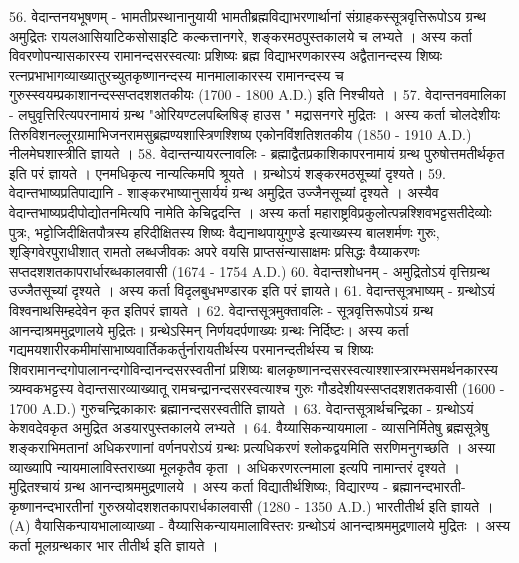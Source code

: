 56. वेदान्तनयभूषणम् -
भामतीप्रस्थानानुयायी भामतीब्रह्मविद्याभरणार्थानां संग्राहकस्सूत्रवृत्तिरूपोऽय ग्रन्थ अमुद्रितः रायलआसियाटिकसोसाइटि कल्कत्तानगरे, शङ्करमठपुस्तकालये च लभ्यते । अस्य कर्ता विवरणोपन्यासकारस्य रामानन्दसरस्वत्याः प्रशिष्यः ब्रह्म विद्याभरणकारस्य अद्वैतानन्दस्य शिष्यः रत्नप्रभाभागव्याख्यातुरच्युतकृष्णानन्दस्य मानमालाकारस्य रामानन्दस्य च गुरुस्स्वयम्प्रकाशानन्दस्सप्तदशशतकीयः (1700 - 1800 A.D.) इति निश्चीयते । 
57. वेदान्तनवमालिका -
लघुवृत्तिरित्यपरनामायं ग्रन्थ  "ओरियण्टलपब्लिषिङ् हाउस " मद्रासनगरे मुद्रितः । अस्य कर्ता चोलदेशीयः तिरुविशनल्लूरग्रामाभिजनरामसुब्रह्मण्यशास्त्रिणश्शिष्य एकोनविंशतिशतकीय (1850 - 1910 A.D.) नीलमेघशास्त्रीति ज्ञायते ।
58. वेदान्तन्यायरत्नावलिः -
ब्रह्माद्वैतप्रकाशिकापरनामायं ग्रन्थ पुरुषोत्तमतीर्थकृत इति परं ज्ञायते । एनमधिकृत्य नान्यत्किमपि श्रूयते । ग्रन्थोऽयं शङ्करमठसूच्यां दृश्यते। 
59. वेदान्तभाष्यप्रतिपाद्यानि - 
शाङ्करभाष्यानुसार्ययं ग्रन्थ अमुद्रित उज्जैनसूच्यां दृश्यते । अस्यैव वेदान्तभाष्यप्रदीपोद्योतनमित्यपि नामेति केचिद्वदन्ति । अस्य कर्ता महाराष्ट्रविप्रकुलोत्पन्नश्शिवभट्टसतीदेव्योः पुत्रः, भट्टोजिदीक्षितपौत्रस्य हरिदीक्षितस्य शिष्यः वैद्यनाथपायुगुण्डे इत्याख्यस्य बालशर्मणः गुरुः, शृङ्गिवेरपुराधीशात् रामतो लब्धजीवकः अपरे वयसि प्राप्तसंन्यासाक्षमः प्रसिद्धः वैय्याकरणः सप्तदशशतकापरार्धारब्धकालवासी (1674 - 1754 A.D.) 
60. वेदान्तशोधनम् - अमुद्रितोऽयं वृत्तिग्रन्थ उज्जैतसूच्यां दृश्यते । अस्य कर्ता विदृलबुधभण्डारक इति परं ज्ञायते।
61. वेदान्तसूत्रभाष्यम् - ग्रन्थोऽयं विश्वनाथसिम्हदेवेन कृत इतिपरं ज्ञायते ।
62. वेदान्तसूत्रमुक्तावलिः - सूत्रवृत्तिरूपोऽयं ग्रन्थ आनन्दाश्रममुद्रणालये मुद्रितः। ग्रन्थेऽस्मिन् निर्णयदर्पणाख्यः ग्रन्थः निर्दिष्टः। अस्य कर्ता गद्यमयशारीरकमीमांसाभाष्यवार्तिककर्तुर्नारायतीर्थस्य परमानन्दतीर्थस्य च शिष्यः शिवरामानन्दगोपालानन्दगोविन्दानन्दसरस्वतीनां प्रशिष्यः बालकृष्णानन्दसरस्वत्याश्शास्त्रारम्भसमर्थनकारस्य त्र्यम्वकभट्टस्य वेदान्तसारव्याख्यातू रामचन्द्रानन्दसरस्वत्याश्च गुरुः गौडदेशीयस्सप्तदशशतकवासी (1600 - 1700 A.D.) गुरुचन्द्रिकाकारः ब्रह्मानन्दसरस्वतीति ज्ञायते । 
63. वेदान्तसूत्रार्थचन्द्रिका - ग्रन्थोऽयं केशवदेवकृत अमुद्रित अडयारपुस्तकालये लभ्यते । 
64. वैय्यासिकन्यायमाला -
व्यासनिर्मितेषु ब्रह्मसूत्रेषु शङ्कराभिमतानां अधिकरणानां वर्णनपरोऽयं ग्रन्थः प्रत्यधिकरणं श्लोकद्वयमिति सरणिमनुगच्छति । अस्या व्याख्यापि न्यायमालाविस्तराख्या मूलकृतैव कृता । अधिकरणरत्नमाला इत्यपि नामान्तरं दृश्यते । मुद्रितश्चायं ग्रन्थ आनन्दाश्रममुद्रणालये । अस्य कर्ता विद्यातीर्थशिष्यः, विद्यारण्य - ब्रह्मानन्दभारती-कृष्णानन्दभारतीनां गुरुस्रयोदशशतकापरार्धकालवासी (1280 - 1350 A.D.) भारतीतीर्थ इति ज्ञायते । 
(A) वैयासिकन्पायभालाव्याख्या - वैय्यासिकन्यायमालाविस्तरः 
ग्रन्थोऽयं आनन्दाश्रममुद्रणालये मुद्रितः । अस्य कर्ता मूलग्रन्थकार भार तीतीर्थ इति ज्ञायते । 
